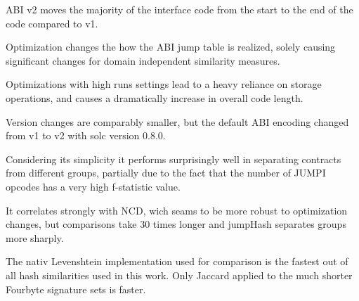 \documentclass[../main.tex]{subfiles}
\begin{document}
ABI v2 moves the majority of the interface code from the start to the end of the code compared to v1.

Optimization changes the how the ABI jump table is realized, solely causing significant changes for domain independent similarity measures.

Optimizations with high runs settings lead to a heavy reliance on storage operations, and causes a dramatically increase in overall code length.

Version changes are comparably smaller, but the default ABI encoding changed from v1 to v2 with solc version 0.8.0.

Considering its simplicity it performs surprisingly well in separating contracts from different groups, partially due to the fact that the number of JUMPI opcodes has a very high f-statistic value.

It correlates strongly with NCD, wich seams to be more robust to optimization changes, but comparisons take 30 times longer and jumpHash separates groups more sharply.

The nativ Levenshtein implementation used for comparison is the fastest out of all hash similarities used in this work. Only Jaccard applied to the much shorter Fourbyte signature sets is faster.
\end{document}
